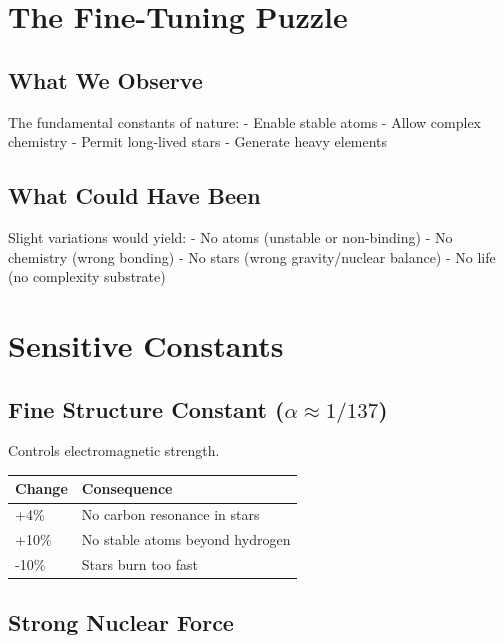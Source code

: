 \documentclass[
  11pt,
  letterpaper,
  twoside,
  openright]{book}
\begin{document}
\section{The Fine-Tuning Puzzle}\label{the-fine-tuning-puzzle}

\subsection{What We Observe}\label{what-we-observe}

The fundamental constants of nature: - Enable stable atoms - Allow
complex chemistry - Permit long-lived stars - Generate heavy elements

\subsection{What Could Have Been}\label{what-could-have-been}

Slight variations would yield: - No atoms (unstable or non-binding) - No
chemistry (wrong bonding) - No stars (wrong gravity/nuclear balance) -
No life (no complexity substrate)

\section{Sensitive Constants}\label{sensitive-constants}

\subsection{\texorpdfstring{Fine Structure Constant
(\(\alpha \approx 1/137\))}{Fine Structure Constant (\textbackslash alpha \textbackslash approx 1/137)}}\label{fine-structure-constant-alpha-approx-1137}

Controls electromagnetic strength.

\begin{longtable}[]{@{}ll@{}}
\toprule\noalign{}
Change & Consequence \\
\midrule\noalign{}
\endhead
\bottomrule\noalign{}
\endlastfoot
+4\% & No carbon resonance in stars \\
+10\% & No stable atoms beyond hydrogen \\
-10\% & Stars burn too fast \\
\end{longtable}

\subsection{Strong Nuclear Force}\label{strong-nuclear-force}
\end{document}
